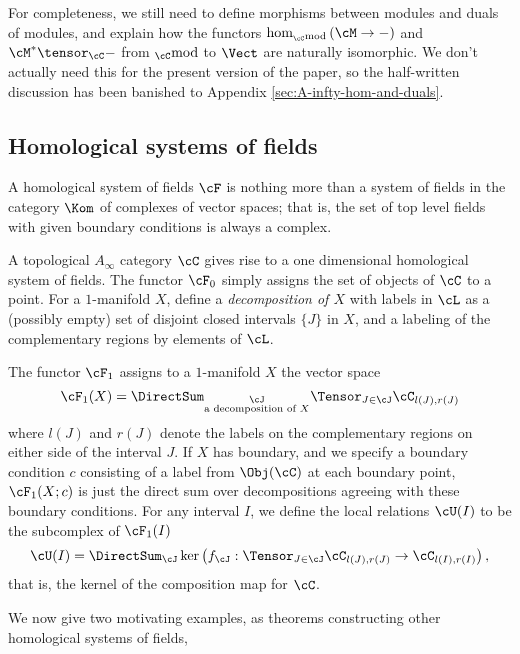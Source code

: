 \newcommand{\lmod}[1]{{}_{#1}{\operatorname{mod}}}
For completeness, we still need to define morphisms between modules and duals of modules, and explain how the functors $\hom_{\lmod{\cC}}\left(\cM \to -\right)$ and $\cM^* \tensor_{\cC} -$ from $\lmod{\cC}$ to $\Vect$ are naturally isomorphic. We don't actually need this for the present version of the paper, so the half-written discussion has been banished to Appendix \ref{sec:A-infty-hom-and-duals}.

\subsection{Homological systems of fields}
A homological system of fields $\cF$ is nothing more than a system of fields in the category $\Kom$ of complexes of vector spaces; that is, the set of top level fields with given boundary conditions is always a complex.



A topological $A_\infty$ category $\cC$ gives rise to a one dimensional homological system of fields. The functor $\cF_0$ simply assigns the set of objects of $\cC$ to a point. 
For a $1$-manifold $X$, define a \emph{decomposition of $X$} with labels in $\cL$ as a (possibly empty) set of disjoint closed intervals $\{J\}$ in $X$, and a labeling of the complementary regions by elements of $\cL$.

The functor $\cF_1$ assigns to a $1$-manifold $X$ the vector space
\begin{equation*}
\cF_1(X) = \DirectSum_{\substack{\cJ \\ \text{a decomposition of $X$}}} \Tensor_{J \in \cJ} \cC_{l(J),r(J)}
\end{equation*}
where $l(J)$ and $r(J)$ denote the labels on the complementary regions on either side of the interval $J$. If $X$ has boundary, and we specify a boundary condition $c$ consisting of a label from $\Obj(\cC)$ at each boundary point, $\cF_1(X;c)$ is just the direct sum over decompositions agreeing with these boundary conditions. For any interval $I$, we define the local relations $\cU(I)$ to be the subcomplex of $\cF_1(I)$
\begin{equation*}
\cU(I) = \DirectSum_{\cJ} \ker\left(f_\cJ : \Tensor_{J \in \cJ} \cC_{l(J),r(J)} \to \cC_{l(I),r(I)} \right),
\end{equation*}
that is, the kernel of the composition map for $\cC$.


We now give two motivating examples, as theorems constructing other homological systems of fields,


